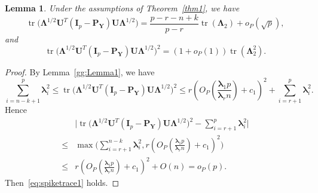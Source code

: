 \documentclass[12pt]{article} %
\DeclareMathOperator{\mytr}{tr}
\newcommand{\bP}{\mathbf{P}}
\newcommand{\bY}{\mathbf{Y}}
\newcommand{\bI}{\mathbf{I}}
\newcommand{\bU}{\mathbf{U}}
\newcommand{\bfsym}[1]{\ensuremath{\boldsymbol{#1}}}
\def\blambda {\bfsym {\lambda}}
\def\bLambda {\bfsym {\Lambda}}
\newtheorem{lemma}{Lemma}
\theoremstyle{definition}
\begin{document}
\begin{lemma}\label{gg:Lemma2}
    Under the assumptions of Theorem~\ref{thm1}, we have
    \begin{equation}\label{eq:spiketrace2}
        \mytr\big(\bLambda^{1/2} \bU^T (\bI_p-\bP_{\bY})\bU \bLambda^{1/2}\big)
= \frac{p-r-n+k}{p-r}\mytr(\bLambda_2)+o_P(\sqrt{p}),
\end{equation}
and
    \begin{equation}\label{eq:spiketrace1}
    \mytr\big(\bLambda^{1/2} \bU^T (\bI_p-\bP_{\bY})\bU \bLambda^{1/2}\big)^2 
 =(1+o_P(1))\mytr(\bLambda_2^2).
    \end{equation}
\end{lemma}
\begin{proof}
    By Lemma~\ref{gg:Lemma1}, we have
$$
    \sum_{i=n-k+1}^p \blambda_i^2\leq \mytr\big(\bLambda^{1/2} \bU^T (\bI_p-\bP_{\bY})\bU \bLambda^{1/2}\big)^2 \leq  r(O_P(\frac{\blambda_1 p}{\blambda_r n})+c_1)^2+\sum_{i=r+1}^p \blambda_i^2.
$$
    Hence
    \begin{equation*}
        \begin{aligned}
        &\big|\mytr\big(\bLambda^{1/2} \bU^T (\bI_p-\bP_{\bY})\bU \bLambda^{1/2}\big)^2 - \sum_{i=r+1}^p \blambda_i^2 \big|\\
        \leq &
            \max\Big(\sum_{i=r+1}^{n-k} \blambda_i^2 , r(O_P(\frac{\blambda_1 p}{\blambda_r n})+c_1)^2\Big)\\
        \leq &
            r(O_P(\frac{\blambda_1 p}{\blambda_r n})+c_1)^2+O(n)=o_P(p).
        \end{aligned}
    \end{equation*}
    Then~\eqref{eq:spiketrace1} holds.


\end{proof}
\end{document}
